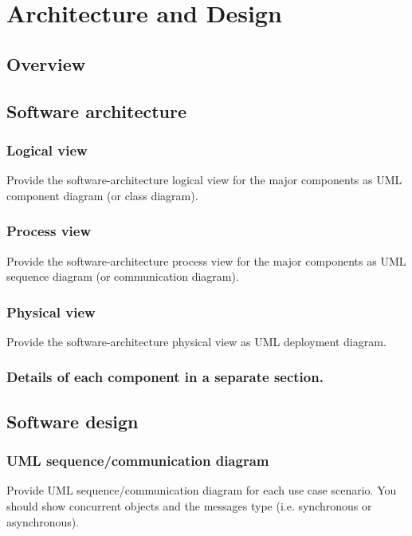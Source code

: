 \chapter{Architecture and Design}

\section{Overview}

\section{Software architecture}

\subsection{Logical view}

Provide the software-architecture logical view for the major components as UML component diagram (or class diagram).

\subsection{Process view}

Provide the software-architecture process view for the major components as UML sequence diagram (or communication diagram).

\subsection{Physical view}
Provide the software-architecture physical view as UML deployment diagram.

\subsection{Details of each component in a \textbf{separate section}.}

\section{Software design}

\subsection{UML sequence/communication diagram}

Provide UML sequence/communication diagram for each use case scenario. You should show concurrent objects and the messages type (i.e. synchronous or asynchronous).



